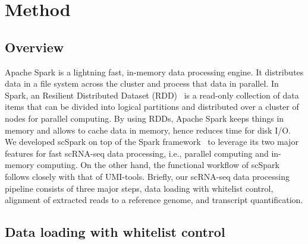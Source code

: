 \documentclass[conference]{IEEEtran}
\begin{document}

\section{Method}
\subsection{Overview}
Apache Spark is a lightning fast, in-memory data processing engine.
It distributes data in a file system across the cluster and process that data in parallel. 
In Spark, an Resilient Distributed Dataset (RDD)~\cite{Zaharia2012Resilient} is a read-only collection of data items that can be divided into logical partitions and distributed over a cluster of nodes for parallel computing. 
By using RDDs, Apache Spark keeps things in memory and allows to cache data in memory, hence reduces time for disk I/O.
%
We developed scSpark on top of the Spark framework~\cite{zaharia2010spark} to leverage its two major features for fast scRNA-seq data processing, i.e., parallel computing and in-memory computing. 
On the other hand, the functional workflow of scSpark follows closely with that of UMI-tools.
Briefly, our scRNA-seq data processing pipeline consists of three major steps, data loading with whitelist control, alignment of extracted reads to a reference genome, and transcript quantification. 

\subsection{Data loading with whitelist control}

\end{document}
